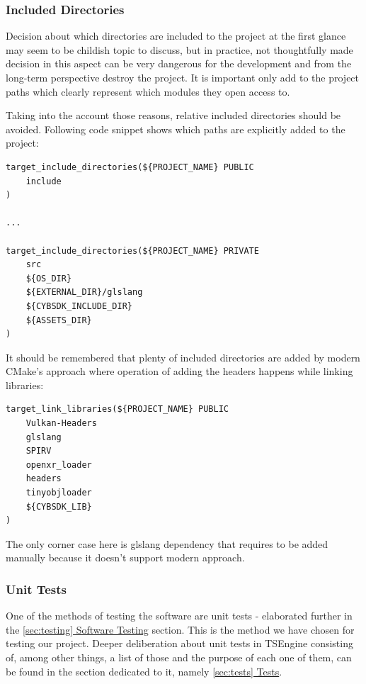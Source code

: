 \subsubsection{Included Directories}
\hspace{\parindent} Decision about which directories are included to the project at the first glance may seem to be childish topic to discuss, but in practice, not thoughtfully made decision in this aspect can be very dangerous for the development and from the long-term perspective destroy the project. It is important only add to the project paths which clearly represent which modules they open access to.

Taking into the account those reasons, relative included directories should be avoided.
Following code snippet shows which paths are explicitly added to the project:
\label{lst:exp_incl}
\begin{lstlisting}[caption=Explicitly included directories (./engine/CMakeLists.txt)]
target_include_directories(${PROJECT_NAME} PUBLIC
    include
)

...

target_include_directories(${PROJECT_NAME} PRIVATE
    src
    ${OS_DIR}
    ${EXTERNAL_DIR}/glslang
    ${CYBSDK_INCLUDE_DIR}
    ${ASSETS_DIR}
)
\end{lstlisting}

It should be remembered that plenty of included directories are added by modern CMake's approach where operation of adding the headers happens while linking libraries: 
\begin{lstlisting}[caption=Implicitly added directories (./engine/CMakeLists.txt)]
target_link_libraries(${PROJECT_NAME} PUBLIC
    Vulkan-Headers
    glslang
    SPIRV
    openxr_loader
    headers
    tinyobjloader
    ${CYBSDK_LIB}
)
\end{lstlisting}
The only corner case here is glslang dependency that requires to be added manually because it doesn't support modern approach.

\subsubsection{Unit Tests}
\label{sec:build_unit_tests}
\hspace{\parindent} One of the methods of testing the software are unit tests - elaborated further in the \hyperref[sec:testing]{\ref*{sec:testing} Software Testing} section. This is the method we have chosen for testing our project.
Deeper deliberation about unit tests in TSEngine consisting of, among other things, a list of those and the purpose of each one of them, can be found in the section dedicated to it, namely \hyperref[sec:tests]{\ref*{sec:tests} Tests}.

